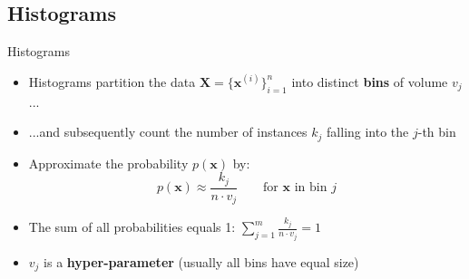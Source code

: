 \subsection{Histograms}

\begin{frame}{Histograms}{}
	\begin{itemize}
		\item Histograms partition the data $\bm{X} = \{ \bm{x}^{(i)} \}_{i=1}^n$ into distinct \textbf{bins} of volume $v_j$...
		\item ...and subsequently count the number of instances $k_j$ falling into the $j$-th bin
		\item Approximate the probability $p(\bm{x})$ by:
		\begin{equation}
			p(\bm{x}) \approx \frac{k_j}{n \cdot v_j}\qquad \text{for $\bm{x}$ in bin $j$}
		\end{equation}
		\item The sum of all probabilities equals 1: $\sum_{j=1}^m \frac{k_j}{n \cdot v_j} = 1$
		\item $v_j$ is a \textbf{hyper-parameter} (usually all bins have equal size) 
	\end{itemize}
\end{frame}


